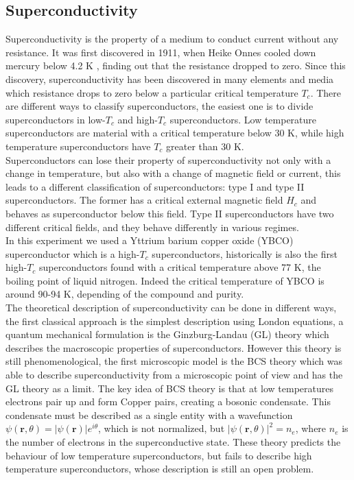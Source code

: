 \documentclass[a4paper,10pt]{article}
\begin{document}
\subsection{Superconductivity}
Superconductivity is the property of a medium to conduct current without any resistance. It was first discovered in 1911, when Heike Onnes cooled down mercury below 4.2 K \cite{firstsuperconductor}, finding out that the resistance dropped to zero. Since this discovery, superconductivity has been discovered in many elements and media which resistance drops to zero below a particular critical temperature $T_c$. There are different ways to classify superconductors, the easiest one is to divide superconductors in low-$T_c$ and high-$T_c$ superconductors. Low temperature superconductors are material with a critical temperature below $30$ K, while high temperature superconductors have $T_c$ greater than 30 K.\\
Superconductors can lose their property of superconductivity not only with a change in temperature, but also with a change of magnetic field or current, this leads to a different classification of superconductors: type I and type II superconductors. The former has a critical external magnetic field $H_c$ and behaves as superconductor below this field. Type II superconductors have two different critical fields, and they behave differently in various regimes.\\
In this experiment we used a Yttrium barium copper oxide (YBCO) superconductor which is a high-$T_c$ superconductors, historically is also the first high-$T_c$ superconductors found with a critical temperature above 77 K, the boiling point of liquid nitrogen. Indeed the critical temperature of YBCO is around 90-94 K, depending of the compound and purity.\\
The theoretical description of superconductivity can be done in different ways, the first classical approach is the simplest description using London equations, a quantum mechanical formulation is the Ginzburg-Landau (GL) theory which describes the macroscopic properties of superconductors. However this theory is still phenomenological, the first microscopic model is the BCS theory which was able to describe superconductivity from a microscopic point of view and has the GL theory as a limit. The key idea of BCS theory is that at low temperatures electrons pair up and form Copper pairs, creating a bosonic condensate. This condensate must be described as a single entity with a wavefunction $\psi(\mathbf{r},\theta) = |\psi(\mathbf{r})| e^{i\theta}$, which is not normalized, but $|\psi(\mathbf{r},\theta)|^2 = n_e$, where $n_e$ is the number of electrons in the superconductive state. These theory predicts the behaviour of low temperature superconductors, but fails to describe high temperature superconductors, whose description is still an open problem.\\
\end{document}
